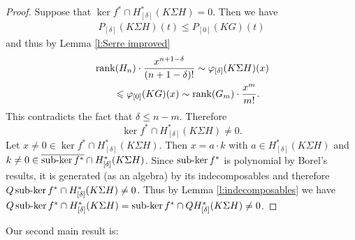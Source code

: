 \begin{proof}
Suppose that $\ker f^*\cap H^*_{[\delta]}(K\Sigma H)=0$. Then we have
\begin{align*}
P_{[\delta]}(K\Sigma H)(t)\leq P_{[0]}(KG)(t)
\end{align*}
and thus by Lemma \ref{l:Serre improved}
\begin{align*}
&\operatorname{rank}(H_n)\cdot\frac{x^{n+1-\delta}}{(n+1-\delta)!}\sim\varphi_{[\delta]}(K\Sigma H)(x)\\
&\qquad\leqslant\varphi_{[0]}(KG)(x)\sim\operatorname{rank}(G_m)\cdot\frac{x^m}{m!}.
\end{align*} 
This contradicts the fact that $\delta\leq n-m$. Therefore 
$$\ker f^*\cap H^*_{[\delta]}(K\Sigma H)\not=0.$$
Let $x\not=0\in\ker f^*\cap H^*_{[\delta]}(K\Sigma H)$. Then $x=a\cdot k$ with $a\in H^*_{[\delta]}(K\Sigma H)$ and $k\not=0\in\overline{\operatorname{sub-ker} f^*}\cap H^*_{[\delta]}(K\Sigma H)$. Since $\operatorname{sub-ker} f^*$ is polynomial by Borel's results, it is generated (as an algebra) by its indecomposables and therefore $Q\operatorname{sub-ker} f^*\cap H^*_{[\delta]}(K\Sigma H)\not=0$. Thus by Lemma \ref{l:indecomposables} we have $Q\operatorname{sub-ker} f^*\cap H^*_{[\delta]}(K\Sigma H)=\operatorname{sub-ker} f^*\cap QH^*_{[\delta]}(K\Sigma H)\not=0$.
\end{proof}

\vskip5cm
Our second main result is:

\begin{thm_second_main}

\end{thm_second_main}

